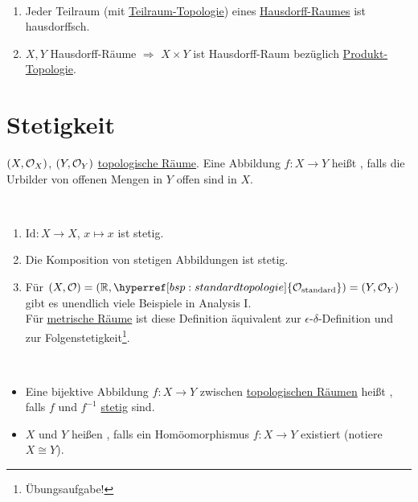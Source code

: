 \begin{remark}
  \
  \begin{enumerate}
    \item Jeder Teilraum (mit \hyperref[def:teilraumtopologie]{Teilraum-Topologie}) eines \hyperref[def:hausdorffsch]{Hausdorff-Raumes} ist hausdorffsch. 
    \item $ X, Y $ Hausdorff-Räume $ \Rightarrow $ $ X \times Y $ ist Hausdorff-Raum bezüglich \hyperref[def:produkttopologie]{Produkt-Topologie}.
  \end{enumerate}
\end{remark}

\section{Stetigkeit}

\begin{definition}[Stetigkeit]
  \label{def:stetig}
  $ (X, \mathcal{O}_X) $, $ (Y, \mathcal{O}_Y) $ \hyperref[def:topologie]{topologische Räume}. Eine Abbildung $ f : X \to Y $ heißt , falls die Urbilder von offenen Mengen in $ Y $ offen sind in $ X $.
\end{definition}

\begin{example}
  \
  \begin{enumerate}
    \item $ \text{Id}: X \to X $, $ x \mapsto x $ ist stetig.
    \item Die Komposition von stetigen Abbildungen ist stetig.
    \item Für $ (X, \O) = (\R, \hyperref[bsp:standardtopologie]{\O_\text{standard}}) = (Y, \O_Y) $ gibt es unendlich viele Beispiele in Analysis I. \\
    Für \hyperref[def:metrischerRaum]{metrische Räume} ist diese Definition äquivalent zur $ \epsilon $-$ \delta $-Definition und zur Folgenstetigkeit\footnote{Übungsaufgabe!}.
  \end{enumerate}
\end{example}

\begin{definition}[Homöomorphismus]
  \label{def:homoeomorphismus}
  \
  \begin{itemize}
    \item Eine bijektive Abbildung $ f: X \to Y $ zwischen \hyperref[def:topologie]{topologischen Räumen} heißt , falls $ f $ und $ f^{-1} $ \hyperref[def:stetig]{stetig} sind.
    \item $ X $ und $ Y $ heißen , falls ein Homöomorphismus $ f: X \to Y $ existiert (notiere $ X \cong Y $). 
  \end{itemize}
\end{definition}

